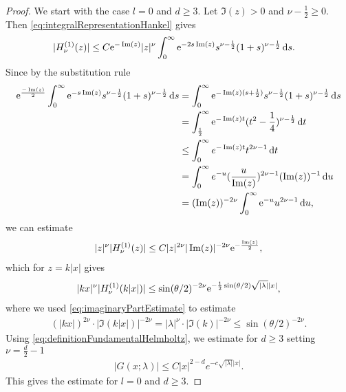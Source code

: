 \begin{proof}
  We start with the case $l = 0$ and $d \geq 3$.
  Let $\Im(z) > 0$ and $\nu - \frac{1}{2} \geq 0$.
  Then \eqref{eq:integralRepresentationHankel} gives
  \begin{align*}
    |H_\nu^{(1)}(z)|
    &\leq C \mathrm{e}^{-\operatorname{Im}(z)} |z|^\nu \int_0^\infty \mathrm{e}^{-2s \operatorname{Im}(z)} s^{\nu - \frac{1}{2}} (1 + s)^{\nu - \frac{1}{2}} \, {\operatorname{d}\!{s}}.
  \end{align*}
  Since by the substitution rule
  \begin{align*}
    \mathrm{e}^{\frac{-\operatorname{Im}(z)}{2}} \int_0^\infty \mathrm{e}^{-s \operatorname{Im}(z)} s^{\nu - \frac{1}{2}} ( 1 + s )^{\nu - \frac{1}{2}} \, {\operatorname{d}\!{s}}
    &= \int_0^\infty \mathrm{e}^{-\operatorname{Im}(z) ( s + \frac{1}{2})} s^{\nu - \frac{1}{2}} ( 1 + s )^{\nu - \frac{1}{2}} \, {\operatorname{d}\!{s}} \\
    &= \int_{\frac{1}{2}}^\infty \mathrm{e}^{-\operatorname{Im}(z) t } (t^2 - \frac{1}{4} ) ^{\nu - \frac{1}{2}} \, {\operatorname{d}\!{t}} \\
    &\leq \int_0^\infty e^{-\operatorname{Im}(z) t} t^{2\nu - 1} \, {\operatorname{d}\!{t}} \\
    &= \int_0^\infty e^{-u} (\frac{ u}{\operatorname{Im}(z)} )^{2 \nu - 1} (\operatorname{Im}(z))^{-1} \, {\operatorname{d}\!{u}} \\
    &= (\operatorname{Im}(z))^{-2 \nu} \int_0^\infty \mathrm{e}^{-u} u^{2 \nu - 1} \, {\operatorname{d}\!{u}},
  \end{align*}
  we can estimate
  \begin{align*}
    |z|^\nu |H_\nu^{(1)}(z)| \leq C |z|^{2 \nu} |\operatorname{Im}(z)|^{-2\nu} \mathrm{e}^{-\frac{\operatorname{Im}(z)}{2}},
  \end{align*}
  which for $z = k|x|$ gives
  \begin{align}
    \label{eq:zHEstimate}
    |kx|^\nu |H_\nu^{(1)}(k |x|)| \leq \sin(\theta/2)^{-2\nu} \mathrm{e}^{-\frac{1}{2} \sin(\theta/2) \sqrt{|\lambda|} |x|},
  \end{align}
  where we used \eqref{eq:imaginaryPartEstimate} to estimate
  \begin{align*}
    (|kx|)^{2\nu} \cdot |\Im(k|x|)|^{-2\nu} 
    = |\lambda|^\nu \cdot |\Im(k)|^{-2\nu} 
    \leq \sin(\theta/2)^{-2\nu}.
  \end{align*}
  Using \eqref{eq:definitionFundamentalHelmholtz}, we estimate for $d \geq 3$ setting $\nu = \frac{d}{2} - 1$
  \begin{align*}
    |G(x; \lambda)| 
    \leq C  |x|^{2 - d} e^{-c \sqrt{|\lambda|} |x|}.
  \end{align*}
  This gives the estimate for $l = 0$ and $d \geq 3$.


\end{proof}

